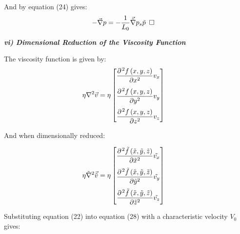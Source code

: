 \documentclass[titlepage]{article}
\begin{document}
\noindent And by equation (24) gives:
\begin{align}
    -\vec{\nabla}p &= -\displaystyle\frac{1}{L_{0}}\vec{\tilde{\nabla}}p_{s}\tilde{p}\hspace*{5pt}\square
\end{align}

\begin{center}
    \textbf{\emph{vi) Dimensional Reduction of the Viscosity Function}}
\end{center}

\noindent The viscosity function is given by: 
\begin{align}
    \eta\nabla^2\vec{v} &=\eta\begin{bmatrix}
        \displaystyle\frac{\partial^{\hspace*{1pt}2}{f\left(x,y,z\right)}}{\partial{x^{2}}}v_{x} \\[0.4cm]
        \displaystyle\frac{\partial^{\hspace*{1pt}2}{f\left(x,y,z\right)}}{\partial{y^{2}}}v_{y}  \\[0.4cm]
        \displaystyle\frac{\partial^{\hspace*{1pt}2}{f\left(x,y,z\right)}}{\partial{z^{2}}}v_{z}
    \end{bmatrix}
\end{align}

\noindent And when dimensionally reduced: 

\begin{align}
    {\eta}\tilde{\nabla}^2\vec{\tilde{v}} &= {\eta}\begin{bmatrix}
        \displaystyle\frac{\partial^{\hspace*{1pt}2}{\tilde{f}\left(\tilde{x},\tilde{y},\tilde{z}\right)}}{\partial{\tilde{x}^{2}}}\tilde{v_{x}} \\[0.4cm]
        \displaystyle\frac{\partial^{\hspace*{1pt}2}{\tilde{f}\left(\tilde{x},\tilde{y},\tilde{z}\right)}}{\partial{\tilde{y}^{2}}}\tilde{v_{y}}  \\[0.4cm]
        \displaystyle\frac{\partial^{\hspace*{1pt}2}{\tilde{f}\left(\tilde{x},\tilde{y},\tilde{z}\right)}}{\partial{\tilde{z}^{2}}} \tilde{v_{z}}
    \end{bmatrix}
\end{align}

\newpage
\noindent Substituting equation (22) into equation (28) with a characteristic velocity $V_{0}$ gives: 
\end{document}
